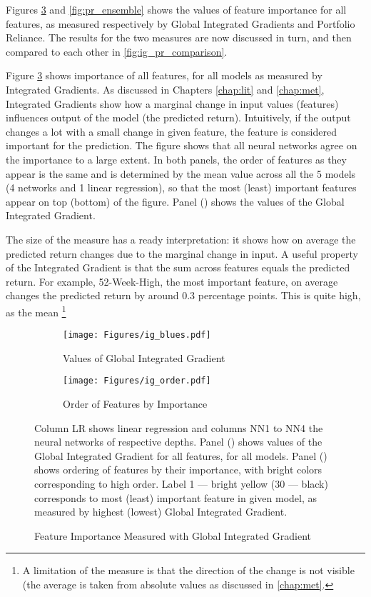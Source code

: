 	Figures \ref{fig:ig_ensemble} and \ref{fig:pr_ensemble} shows the values of feature importance for all features, as measured respectively by Global Integrated Gradients and Portfolio Reliance. The results for the two measures are now discussed in turn, and then compared to each other in \ref{fig:ig_pr_comparison}.
	
	Figure \ref{fig:ig_ensemble} shows importance of all features, for all models as measured by Integrated Gradients. As discussed in Chapters \ref{chap:lit} and \ref{chap:met}, Integrated Gradients show how a marginal change in input values (features) influences output of the model (the predicted return). Intuitively, if the output changes a lot with a small change in given feature, the feature is considered important for the prediction. The figure shows that all neural networks agree on the importance to a large extent. In both panels, the order of features as they appear is the same and is determined by the mean value across all the 5 models (4 networks and 1 linear regression), so that the most (least) important features appear on top (bottom) of the figure. Panel () shows the values of the Global Integrated Gradient. 
	
	The size of the measure has a ready interpretation: it shows how on average the predicted return changes due to the marginal change in input. A useful property of the Integrated Gradient is that the sum across features equals the predicted return. For example, 52-Week-High, the most important feature, on average changes the predicted return by around 0.3 percentage points. This is quite high, as the mean  \footnote{A limitation of the measure is that the direction of the change is not visible (the average is taken from absolute values as discussed in \ref{chap:met}.}   
	  
	
	\begin{figure}	
		\centering		
		\begin{subfigure}[t]{\textwidth}
			\texttt{[image: Figures/ig\_blues.pdf]}
			\caption{Values of Global Integrated Gradient}
			\label{fig:ig_blues}
		\end{subfigure}
		
		\begin{subfigure}[t]{\textwidth}
			\texttt{[image: Figures/ig\_order.pdf]}
			\caption{Order of Features by Importance}
			\label{fig:ig_order}
		\end{subfigure}
		\caption{Feature Importance Measured with Global Integrated Gradient}
		\medskip
		\small
		Column LR shows linear regression and columns NN1 to NN4 the neural networks of respective depths. Panel () shows values of the Global Integrated Gradient for all features, for all models.  Panel () shows ordering of features by their importance, with bright colors corresponding to high order. Label 1 --- bright yellow (30 --- black) corresponds to most (least) important feature in given model, as measured by highest (lowest) Global Integrated Gradient. 
		\label{fig:ig_ensemble}
	\end{figure}
	
